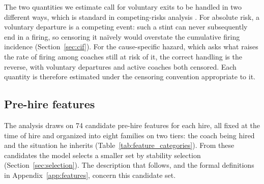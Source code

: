\documentclass[USenglish]{article}
\theoremstyle{dgthm}
\theoremstyle{dgdef}
\begin{document}
The two quantities we estimate call for voluntary exits to be handled in two different ways, which is standard in competing-risks analysis \citep{austin2016}. For absolute risk, a voluntary departure is a competing event: such a stint can never subsequently end in a firing, so censoring it na\"ively would overstate the cumulative firing incidence (Section~\ref{sec:cif}). For the cause-specific hazard, which asks what raises the rate of firing among coaches still at risk of it, the correct handling is the reverse, with voluntary departures and active coaches both censored. Each quantity is therefore estimated under the censoring convention appropriate to it.

\subsection{Pre-hire features}

The analysis draws on 74 candidate pre-hire features for each hire, all fixed at the time of hire and organized into eight families on two tiers: the coach being hired and the situation he inherits (Table~\ref{tab:feature_categories}). From these candidates the model selects a smaller set by stability selection (Section~\ref{sec:selection}). The description that follows, and the formal definitions in Appendix~\ref{app:features}, concern this candidate set.
\end{document}

